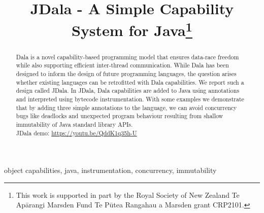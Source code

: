 \documentclass[conference]{IEEEtran}
\newcommand{\dala}{Dala\xspace}
\newcommand{\jdala}{JDala\xspace}
\begin{document}
\title{JDala - A Simple Capability System for Java\thanks{This work is supported in part by the Royal Society of New
  Zealand Te Ap\={a}rangi Marsden Fund Te P\={u}tea Rangahau a Marsden
  grant CRP2101.}
}


\author{
}
\maketitle

\begin{abstract}
\dala is a novel capability-based programming model that ensures data-race freedom while also supporting efficient inter-thread communication. While \dala has been designed to inform the design of future programming languages, the question arises whether existing languages can be retrofitted with \dala capabilities. We report such a design called \jdala. In \jdala,  \dala capabilities are added to Java using annotations and interpreted using bytecode instrumentation. With some examples we demonstrate that by adding three simple annotations to the language, we can avoid concurrency bugs like deadlocks and unexpected program behaviour resulting from shallow immutability of Java standard library APIs.\\
\jdala demo: \url{https://youtu.be/QddK1q35h-U} 

\end{abstract}

\begin{IEEEkeywords}
object capabilities, java, instrumentation, concurrency, immutability 
\end{IEEEkeywords}

















\end{document}
